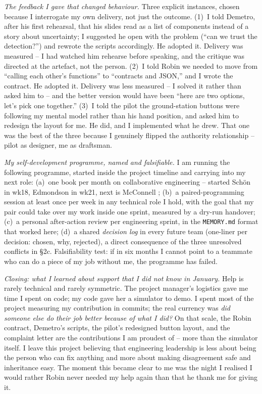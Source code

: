 \textit{The feedback I gave that changed behaviour.}  Three explicit instances, chosen because I interrogate my own delivery, not just the outcome. (1)~I told Demetro, after his first rehearsal, that his slides read as a list of components instead of a story about uncertainty; I suggested he open with the problem (``can we trust the detection?'') and rewrote the scripts accordingly. He adopted it. Delivery was measured -- I had watched him rehearse before speaking, and the critique was directed at the artefact, not the person. (2)~I told Robin we needed to move from ``calling each other's functions'' to ``contracts and JSON,'' and I wrote the contract. He adopted it. Delivery was less measured -- I solved it rather than asked him to -- and the better version would have been ``here are two options, let's pick one together.'' (3)~I told the pilot the ground-station buttons were following my mental model rather than his hand position, and asked him to redesign the layout for me. He did, and I implemented what he drew. That one was the best of the three because I genuinely flipped the authority relationship -- pilot as designer, me as draftsman.

\textit{My self-development programme, named and falsifiable.}  I am running the following programme, started inside the project timeline and carrying into my next role: (a)~one book per month on collaborative engineering -- started Sch\"on \cite{schon1983} in wk18, Edmondson \cite{edmondson1999psychsafety} in wk21, next is McConnell \cite{mcconnell2004}; (b)~a paired-programming session at least once per week in any technical role I hold, with the goal that my pair could take over my work inside one sprint, measured by a dry-run handover; (c)~a personal after-action review per engineering sprint, in the \texttt{MEMORY.md} format that worked here; (d)~a shared \textit{decision log} in every future team (one-liner per decision: chosen, why, rejected), a direct consequence of the three unresolved conflicts in \S2c. Falsifiability test: if in six months I cannot point to a teammate who can do a piece of my job without me, the programme has failed.

\textit{Closing: what I learned about support that I did not know in January.} Help is rarely technical and rarely symmetric. The project manager's logistics gave me time I spent on code; my code gave her a simulator to demo. I spent most of the project measuring my contribution in commits; the real currency was \textit{did someone else do their job better because of what I did?} On that scale, the Robin contract, Demetro's scripts, the pilot's redesigned button layout, and the complaint letter are the contributions I am proudest of -- more than the simulator itself. I leave this project believing that engineering leadership is less about being the person who can fix anything and more about making disagreement safe and inheritance easy. The moment this became clear to me was the night I realised I would rather Robin never needed my help again than that he thank me for giving it.
